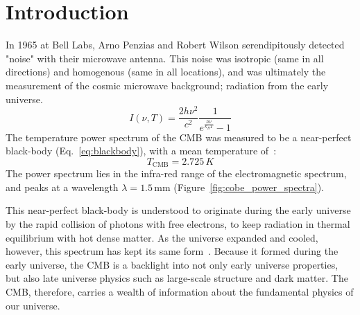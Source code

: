 
\chapter{Introduction} %

\label{ch:intro} %


\newcommand{\keyword}[1]{\textbf{#1}}
\newcommand{\tabhead}[1]{\textbf{#1}}
\newcommand{\code}[1]{\texttt{#1}}
\newcommand{\file}[1]{\texttt{\bfseries#1}}
\newcommand{\option}[1]{\texttt{\itshape#1}}
\newcommand{\enquote}[1]{``#1"}

In 1965 at Bell Labs, Arno Penzias and Robert Wilson serendipitously detected "noise" with their microwave antenna.  This noise was isotropic (same in all directions) and homogenous (same in all locations), and was ultimately the measurement of the cosmic microwave background; radiation from the early universe.
\begin{equation}
    I(\nu,T) = \frac{2h\nu^2}{c^2}\frac{1}{e^{\frac{h\nu}{k_B T}} -1}
    \label{eq:blackbody}
\end{equation}
The temperature power spectrum of the CMB was measured to be a near-perfect black-body (Eq.~\ref{eq:blackbody}), with a mean temperature of~\cite{burke_graham-smith_wilkinson_2019}:
\begin{equation}
    T_{\text{CMB}} = 2.725\,K
\end{equation}
The power spectrum lies in the infra-red range of the electromagnetic spectrum, and peaks at a wavelength $\lambda = 1.5\,\text{mm}$ (Figure~\ref{fig:cobe_power_spectra}). 

This near-perfect black-body is understood to originate during the early universe by the rapid collision of photons with free electrons, to keep radiation in thermal equilibrium with hot dense matter.  As the universe expanded and cooled, however, this spectrum has kept its same form~\cite{weinberg_cosmo}.  Because it formed during the early universe, the CMB is a backlight into not only early universe properties, but also late universe physics such as large-scale structure and dark matter.  The CMB, therefore, carries a wealth of information about the fundamental physics of our universe.


